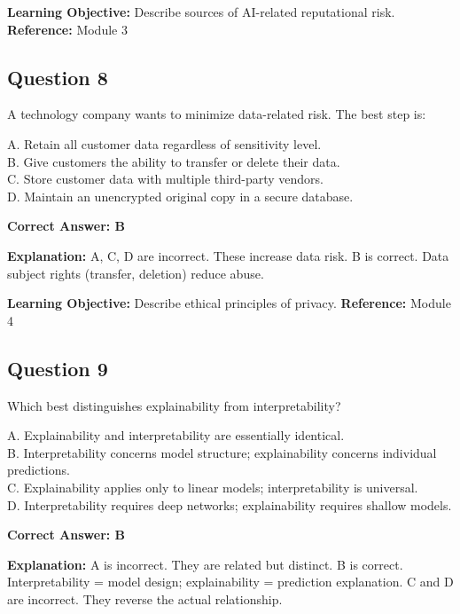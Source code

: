 \documentclass[11pt]{article}
\begin{document}
	\textbf{Learning Objective:} Describe sources of AI-related reputational
	risk.
	\textbf{Reference:} Module 3
	
	\subsection*{Question 8}
	A technology company wants to minimize data-related risk. The best step
	is:
	
	A. Retain all customer data regardless of sensitivity level.\\
	B. Give customers the ability to transfer or delete their data.\\
	C. Store customer data with multiple third-party vendors.\\
	D. Maintain an unencrypted original copy in a secure database.
	
	\vspace{0.4em}
	\textbf{Correct Answer: B}
	
	\textbf{Explanation:}
	A, C, D are incorrect. These increase data risk.
	B is correct. Data subject rights (transfer, deletion) reduce abuse.
	
	\textbf{Learning Objective:} Describe ethical principles of privacy.
	\textbf{Reference:} Module 4
	
	\subsection*{Question 9}
	Which best distinguishes explainability from interpretability?
	
	A. Explainability and interpretability are essentially identical.\\
	B. Interpretability concerns model structure; explainability concerns
	individual predictions.\\
	C. Explainability applies only to linear models; interpretability is
	universal.\\
	D. Interpretability requires deep networks; explainability requires
	shallow models.
	
	\vspace{0.4em}
	\textbf{Correct Answer: B}
	
	\textbf{Explanation:}
	A is incorrect. They are related but distinct.
	B is correct. Interpretability = model design; explainability =
	prediction explanation.
	C and D are incorrect. They reverse the actual relationship.
	
\end{document}
